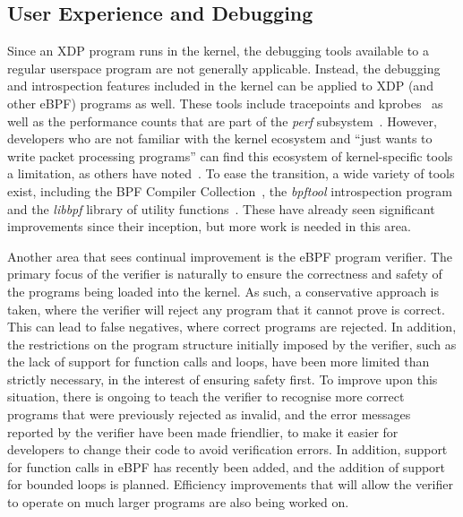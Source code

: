 \documentclass[10pt,sigconf]{acmart}
\begin{document}
\subsection{User Experience and Debugging}
\label{sec:user-exper-debugg}
Since an XDP program runs in the kernel, the debugging tools available to a
regular userspace program are not generally applicable. Instead, the debugging
and introspection features included in the kernel can be applied to XDP (and
other eBPF) programs as well. These tools include tracepoints and
kprobes~\cite{kernel-tracing} as well as the performance counts that are part of
the \emph{perf} subsystem~\cite{perf}. However, developers who are not familiar
with the kernel ecosystem and ``just wants to write packet processing programs''
can find this ecosystem of kernel-specific tools a limitation, as others have
noted~\cite{miano2018creating}. To ease the transition, a wide variety of tools
exist, including the BPF Compiler Collection~\cite{bcc}, the \emph{bpftool}
introspection program~\cite{bpftool} and the \emph{libbpf} library of utility
functions~\cite{libbpf}. These have already seen significant improvements since
their inception, but more work is needed in this area.

Another area that sees continual improvement is the eBPF program verifier. The
primary focus of the verifier is naturally to ensure the correctness and safety
of the programs being loaded into the kernel. As such, a conservative approach
is taken, where the verifier will reject any program that it cannot prove is
correct. This can lead to false negatives, where correct programs are rejected.
In addition, the restrictions on the program structure initially imposed by the
verifier, such as the lack of support for function calls and loops, have been
more limited than strictly necessary, in the interest of ensuring safety first.
To improve upon this situation, there is ongoing to teach the verifier to
recognise more correct programs that were previously rejected as invalid, and
the error messages reported by the verifier have been made friendlier, to make
it easier for developers to change their code to avoid verification errors. In
addition, support for function calls in eBPF has recently been added, and the
addition of support for bounded loops is planned. Efficiency improvements that
will allow the verifier to operate on much larger programs are also being worked
on.
\end{document}
